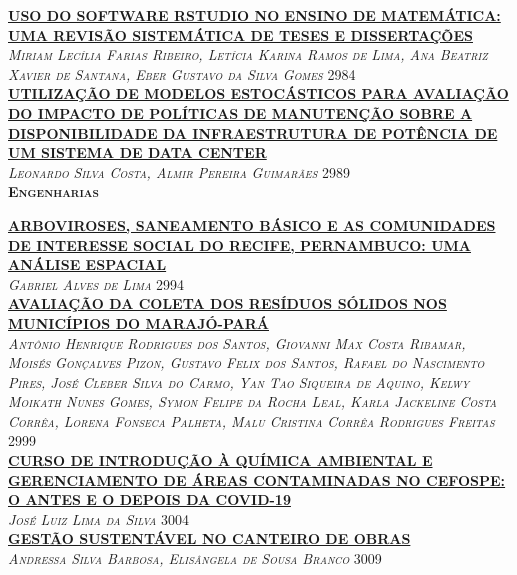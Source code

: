\noindent \textsc{\hyperlink{trabalhos/249489.pdf.1}{\textbf{USO DO SOFTWARE RSTUDIO NO ENSINO DE MATEMÁTICA: UMA REVISÃO SISTEMÁTICA DE TESES E DISSERTAÇÕES}}}\\ 
\noindent \textsc{\textit{Miriam Lecília Farias Ribeiro, Letícia Karina Ramos de Lima, Ana Beatriz Xavier de Santana, Eber Gustavo da Silva Gomes}} \hfill 2984\\ 

\noindent \textsc{\hyperlink{trabalhos/250224.pdf.1}{\textbf{UTILIZAÇÃO DE MODELOS ESTOCÁSTICOS PARA AVALIAÇÃO DO IMPACTO DE POLÍTICAS DE MANUTENÇÃO SOBRE A DISPONIBILIDADE DA INFRAESTRUTURA DE POTÊNCIA DE UM SISTEMA DE DATA CENTER}}}\\ 
\noindent \textsc{\textit{Leonardo Silva Costa, Almir Pereira Guimarães}} \hfill 2989\\ 


\vspace*{2cm} 
\noindent \textsc{\textbf{\LARGE Engenharias}}\\ 
\vspace*{1cm} 

\noindent \textsc{\hyperlink{trabalhos/249589.pdf.1}{\textbf{ARBOVIROSES, SANEAMENTO BÁSICO E AS COMUNIDADES DE INTERESSE SOCIAL DO RECIFE, PERNAMBUCO: UMA ANÁLISE ESPACIAL}}}\\ 
\noindent \textsc{\textit{Gabriel Alves de Lima}} \hfill 2994\\ 

\noindent \textsc{\hyperlink{trabalhos/250256.pdf.1}{\textbf{AVALIAÇÃO DA COLETA DOS RESÍDUOS SÓLIDOS NOS MUNICÍPIOS DO MARAJÓ-PARÁ}}}\\ 
\noindent \textsc{\textit{Antônio Henrique Rodrigues dos Santos, Giovanni Max Costa Ribamar, Moisés Gonçalves Pizon, Gustavo Felix dos Santos, Rafael do Nascimento Pires, José Cleber Silva do Carmo, Yan Tao Siqueira de Aquino, Kelwy Moikath Nunes Gomes, Symon Felipe da Rocha Leal, Karla Jackeline Costa Corrêa, Lorena Fonseca Palheta, Malu Cristina Corrêa Rodrigues Freitas}} \hfill 2999\\ 

\noindent \textsc{\hyperlink{trabalhos/251724.pdf.1}{\textbf{CURSO DE INTRODUÇÃO À QUÍMICA AMBIENTAL E GERENCIAMENTO DE ÁREAS CONTAMINADAS NO CEFOSPE: O ANTES E O DEPOIS DA COVID-19}}}\\ 
\noindent \textsc{\textit{José Luiz Lima da Silva}} \hfill 3004\\ 

\noindent \textsc{\hyperlink{trabalhos/250658.pdf.1}{\textbf{GESTÃO SUSTENTÁVEL NO CANTEIRO DE OBRAS}}}\\ 
\noindent \textsc{\textit{Andressa Silva Barbosa, Elisângela de Sousa Branco}} \hfill 3009\\ 

